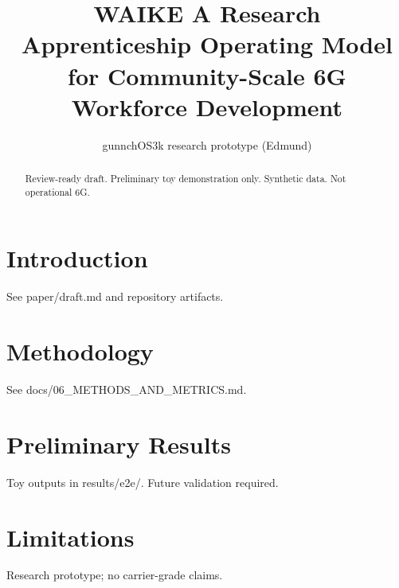 \documentclass{article}
\title{WAIKE A Research Apprenticeship Operating Model for Community-Scale 6G Workforce Development}
\author{gunnchOS3k research prototype (Edmund)}
\begin{document}
\maketitle
\begin{abstract}
Review-ready draft. Preliminary toy demonstration only. Synthetic data. Not operational 6G.
\end{abstract}
\section{Introduction}
See paper/draft.md and repository artifacts.
\section{Methodology}
See docs/06\_METHODS\_AND\_METRICS.md.
\section{Preliminary Results}
Toy outputs in results/e2e/. Future validation required.
\section{Limitations}
Research prototype; no carrier-grade claims.


\end{document}
